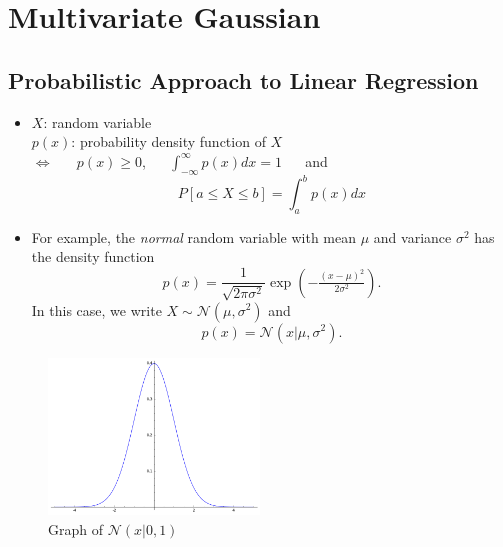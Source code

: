 \documentclass[
]{article}
\author{}
\date{}
\begin{document}
\newcommand{\Ber}{\operatorname{Ber}}
\newcommand{\E}{\operatorname{E}}
\newcommand{\V}{\operatorname{Var}}
\newcommand{\diag}{\operatorname{diag}}

\newcommand{\bi}{\mathbf{i}}
\newcommand{\bj}{\mathbf{j}}
\newcommand{\bt}{\mathbf{t}}

\newcommand{\bh}{{\boldsymbol{h}}}
\newcommand{\bw}{{\boldsymbol{w}}}
\newcommand{\bv}{{\boldsymbol{v}}}
\newcommand{\bx}{{\boldsymbol{x}}}
\newcommand{\by}{{\boldsymbol{y}}}
\newcommand{\bb}{{\boldsymbol{b}}}
\newcommand{\bz}{{\boldsymbol{z}}}
\newcommand{\bu}{{\boldsymbol{u}}}
\newcommand{\bX}{{\boldsymbol{X}}}
\newcommand{\bY}{{\boldsymbol{Y}}}
\newcommand{\bZ}{{\boldsymbol{Z}}}

\hypertarget{multivariate-gaussian}{%
\section{Multivariate Gaussian}\label{multivariate-gaussian}}

\hypertarget{probabilistic-approach-to-linear-regression}{%
\subsection{Probabilistic Approach to Linear
Regression}\label{probabilistic-approach-to-linear-regression}}

\begin{itemize}
\item
  \(X\): random variable\\
  \(p(x)\): probability density function of \(X\)\\
  \hspace*{0.333em}\hspace*{0.333em} \(\Longleftrightarrow\) ~~
  \(p(x) \ge 0\), ~~ \(\int_{-\infty}^\infty p(x) dx =1\) ~~ and
  \[ P[ a \le X \le b ]= \int_a^b p(x) dx \]
\item
  For example, the \emph{normal} random variable with mean \(\mu\) and
  variance \(\sigma^2\) has the density function
  \[ p(x) = \frac 1 {\sqrt{2 \pi \sigma^2}} \exp \left ( -\tfrac{(x-\mu)^2}{2 \sigma^2} \right ). \]
  In this case, we write \(X \sim \mathcal N (\mu, \sigma^2)\) and
  \[ p(x) = \mathcal N(x| \mu, \sigma^2) .\]
\end{itemize}

\begin{figure}
\hypertarget{fig:normal}{%
\centering
\includegraphics[width=0.5\textwidth,height=\textheight]{normal.png}
\caption{Graph of \(\mathcal N(x|0,1)\)}\label{fig:normal}
}
\end{figure}
\end{document}
